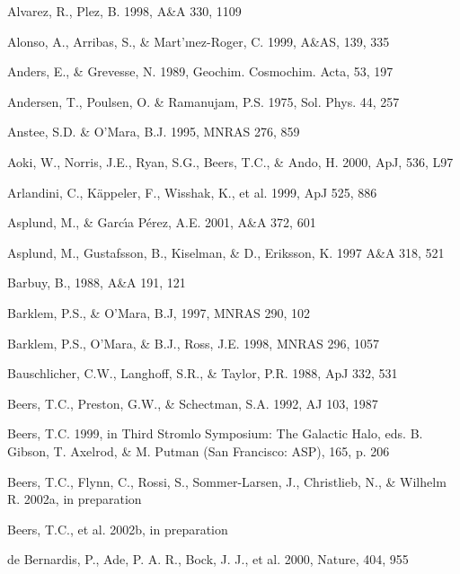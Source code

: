 \documentclass{aa}
\begin{document}
\begin{thebibliography}{}

    Alvarez, R., Plez, B. 1998, A\&A 330, 1109 
    
    Alonso, A., Arribas, S.,
   \& Mart'{\i}nez-Roger, C. 1999, A\&AS, 139, 335

    Anders, E., \& Grevesse, N. 1989,
Geochim. Cosmochim. Acta, 53, 197

     Andersen, T., Poulsen, O. \& Ramanujam,
 P.S. 1975, Sol. Phys. 44, 257

    Anstee, S.D. \& O'Mara, B.J. 1995, 
   MNRAS 276, 859

    Aoki, W., Norris, J.E., Ryan, S.G., Beers, T.C., \&
Ando, H. 2000, ApJ, 536, L97

    Arlandini, C., K\"appeler, F., 
Wisshak, K., et al. 1999, ApJ 525, 886

    Asplund, M., \& Garc\'{\i}a P\'erez, A.E. 2001,
   A\&A 372, 601

    Asplund, M., Gustafsson, B., Kiselman, \& D.,
 Eriksson, K. 1997 A\&A 318, 521

     Barbuy, B., 1988, A\&A 191, 121

     Barklem, P.S., \& O'Mara, B.J, 1997, 
MNRAS 290, 102

     Barklem, P.S., O'Mara, \& B.J., 
Ross, J.E. 1998, MNRAS 296, 1057

     Bauschlicher, C.W., Langhoff, S.R., \& Taylor,
    P.R. 1988, ApJ 332, 531

    Beers, T.C., Preston, G.W., \& Schectman,
   S.A. 1992, AJ 103, 1987
    
    Beers, T.C. 1999, in Third Stromlo
   Symposium: The Galactic Halo, eds. B. Gibson, T. Axelrod, \&
   M. Putman (San Francisco: ASP), 165, p. 206 

    Beers, T.C., Flynn, C., Rossi, S.,
   Sommer-Larsen, J., Christlieb, N., \& Wilhelm R. 2002a, in preparation

    Beers, T.C., et al. 2002b, in preparation

     de Bernardis, P., Ade, P. A. R., Bock,
J. J., et al. 2000, Nature, 404, 955


\end{thebibliography}
\end{document}
